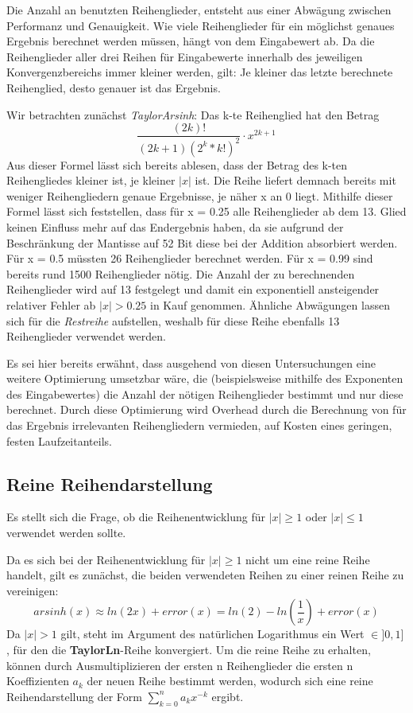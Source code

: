 \documentclass[course=erap] {aspdoc}
\begin{document}
    Die Anzahl an benutzten Reihenglieder, entsteht aus einer Abwägung zwischen Performanz und Genauigkeit.
    Wie viele Reihenglieder für ein möglichst genaues Ergebnis berechnet werden müssen, hängt von dem Eingabewert ab.
    Da die Reihenglieder aller drei Reihen für Eingabewerte innerhalb des jeweiligen Konvergenzbereichs immer kleiner werden, gilt:
    Je kleiner das letzte berechnete Reihenglied, desto genauer ist das Ergebnis.

    Wir betrachten zunächst \textit{TaylorArsinh}:
    Das k-te Reihenglied hat den Betrag
    \[
        \frac{(2k)!}{(2k + 1)(2^k*k!)^2}\cdot x^{2k+1}
    \]
    Aus dieser Formel lässt sich bereits ablesen, dass der Betrag des k-ten Reihengliedes kleiner ist, je kleiner $|x|$ ist.
    Die Reihe liefert demnach bereits mit weniger Reihengliedern genaue Ergebnisse, je näher x an 0 liegt.
    Mithilfe dieser Formel lässt sich feststellen, dass für x = 0.25 alle Reihenglieder ab dem 13. Glied keinen Einfluss mehr auf das Endergebnis haben, da sie aufgrund der Beschränkung der Mantisse auf 52 Bit diese bei der Addition absorbiert werden.
    Für x = 0.5 müssten 26 Reihenglieder berechnet werden.
    Für x = 0.99 sind bereits rund 1500 Reihenglieder nötig.
    Die Anzahl der zu berechnenden Reihenglieder wird auf 13 festgelegt und damit ein exponentiell ansteigender relativer Fehler ab $|x|>0.25$ in Kauf genommen.
    Ähnliche Abwägungen lassen sich für die \textit{Restreihe} aufstellen, weshalb für diese Reihe ebenfalls 13 Reihenglieder verwendet werden.

    Es sei hier bereits erwähnt, dass ausgehend von diesen Untersuchungen eine weitere Optimierung umsetzbar wäre, die (beispielsweise mithilfe des Exponenten des Eingabewertes) die Anzahl der nötigen Reihenglieder bestimmt und nur diese berechnet.
    Durch diese Optimierung wird Overhead durch die Berechnung von für das Ergebnis irrelevanten Reihengliedern vermieden, auf Kosten eines geringen, festen Laufzeitanteils.

    \subsection{Reine Reihendarstellung}\label{subsec:reine-reihendarstellung}

    Es stellt sich die Frage, ob die Reihenentwicklung für $|x|\geq1$ oder $|x|\leq1$ verwendet werden sollte.

    Da es sich bei der Reihenentwicklung für $|x|\geq1$ nicht um eine reine Reihe handelt, gilt es zunächst, die beiden verwendeten Reihen zu einer reinen Reihe zu vereinigen:
    \[
        arsinh(x)\approx ln(2x) + error(x) = ln(2) - ln(\frac{1}{x}) + error(x)
    \]
    Da $|x|>1$ gilt, steht im Argument des natürlichen Logarithmus ein Wert $\in ]0, 1]$, für den die \textbf{TaylorLn}-Reihe konvergiert.
    Um die reine Reihe zu erhalten, können durch Ausmultiplizieren der ersten n Reihenglieder die ersten n Koeffizienten $a_k$ der neuen Reihe bestimmt werden, wodurch sich eine reine Reihendarstellung der Form $\sum_{k=0}^{n} a_k x^{-k}$ ergibt.
\end{document}
